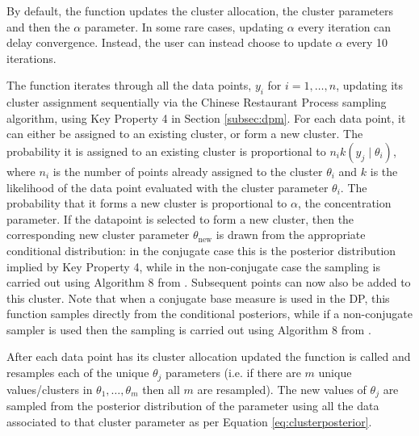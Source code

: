 \documentclass[nojss]{jss}
\begin{document}
By default, the  function updates the cluster allocation, the cluster parameters and then the $\alpha$ parameter. In some rare cases, updating $\alpha$ every iteration can delay convergence. Instead, the user can instead choose to update $\alpha$ every 10 iterations.
\newpage %
The function  iterates through all the data points, $y_i$ for $i=1,\ldots,n$, updating its cluster assignment sequentially via the Chinese Restaurant Process sampling algorithm, using Key Property 4 in Section \ref{subsec:dpm}. For each data point, it can either be assigned to an existing cluster, or form a new cluster. The probability it is assigned to an existing cluster is proportional to $n_i k(y _j \mid \theta _{i})$, where $n_i$ is the number of points already assigned to the cluster $\theta _i$ and $k$ is the likelihood of the data point  evaluated with the cluster parameter $\theta _i$. The probability that it forms a new cluster is proportional to $\alpha$, the concentration parameter. If the datapoint is selected to form a new cluster, then the corresponding new cluster
parameter $\theta_{\text{new}}$ is drawn from the appropriate conditional distribution:
in the conjugate case this is the posterior distribution implied by Key Property 4, while
in the non-conjugate case the sampling is carried out using Algorithm 8 from \citet{neal_markov_2000}.
Subsequent points can now also be added to this cluster. Note that when a conjugate base measure is used in the DP, this function samples directly from the conditional posteriors, while if a non-conjugate sampler is used then the sampling is carried out using Algorithm 8 from \cite{neal_markov_2000}.

After each data point has its cluster allocation updated the function  is called and resamples each of the unique $\theta _j$ parameters (i.e. if there are $m$ unique values/clusters in $\theta_1,\ldots,\theta_m$ then all $m$ are resampled). The new values of $\theta_j$ are sampled from the posterior distribution of the parameter using all the data associated to that cluster parameter as per Equation \eqref{eq:clusterposterior}.
\end{document}
